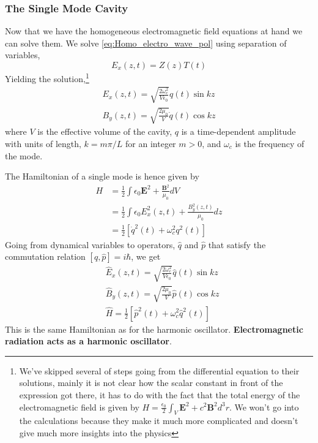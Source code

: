 \subsubsection{The Single Mode Cavity}
Now that we have the homogeneous electromagnetic field equations at hand we can solve them.
We solve \ref{eq:Homo_electro_wave_pol} using separation of variables,
\[
    E_x (z, t)= Z (z)T (t)
\]
Yielding the solution,\footnote{We've skipped several of steps going from the differential equation to their solutions, mainly it is not clear how the scalar constant in front of the expression got there, it has to do with the fact that the total energy of the electromagnetic field is given by $H = \frac{\epsilon_0}{2} \int_V \textbf{E}^2 + c^2 \textbf{B}^2 d^3 r$. We won't go into the calculations because they make it much more complicated and doesn't give much more insights into the physics}
\begin{equation}
    \begin{split}
        E_x (z, t) = \sqrt{\frac{2 \omega_c^2}{V \epsilon_0}}q (t)\sin{kz} \\
        B_y (z, t) = \sqrt{\frac{2 \mu_0}{V}}\dot{q} (t)\cos{kz}
    \end{split}
\end{equation}
where $V$ is the effective volume of the cavity, $q$ is a time-dependent amplitude with units of length, $k = m\pi/L$ for
an integer $m > 0$, and $\omega_c$ is the frequency of the mode.

The Hamiltonian of a single mode is hence given by
\begin{align}
    H &= \frac{1}{2}\int\epsilon_0 \textbf{E}^2 + \frac{\textbf{B}^2}{\mu_0} dV \\
    &= \frac{1}{2}\int\epsilon_0 E_x^2 (z, t) + \frac{B_y^2 (z, t)}{\mu_0} dz \\
    &= \frac{1}{2}[\dot{q}^2 (t) + \omega_c^2 q^2 (t)]
\end{align}
Going from dynamical variables to operators, $\hat{q}$ and $\hat{p}$ that satisfy the commutation relation $[\hat{q}, \hat{p}] = i\hbar$, we get
\begin{align}
     &\hat{E}_x (z, t) = \sqrt{\frac{2 \omega_c^2}{V \epsilon_0}}\hat{q} (t)\sin{kz} \\
     &\hat{B}_y (z, t) = \sqrt{\frac{2 \mu_0}{V}}\hat{p} (t)\cos{kz} \\
     &\hat{H} = \frac{1}{2}[\hat{p}^2 (t) + \omega_c^2 \hat{q}^2 (t)]
\end{align}
This is the same Hamiltonian as for the harmonic oscillator. \textbf{Electromagnetic radiation acts as a harmonic oscillator}.

